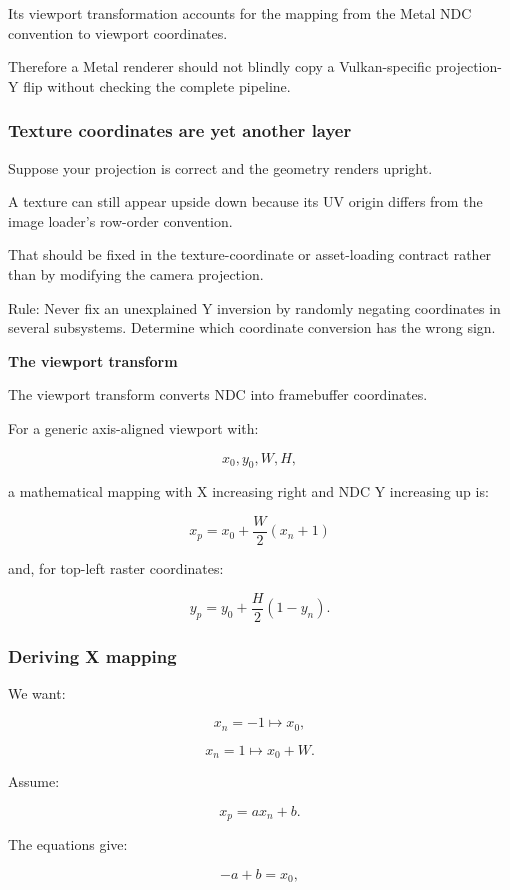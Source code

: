 Its viewport transformation accounts for the mapping from the Metal NDC convention to viewport coordinates.

Therefore a Metal renderer should not blindly copy a Vulkan-specific projection-Y flip without checking the complete pipeline.

\subsubsection{Texture coordinates are yet another layer}\label{texture-coordinates-are-yet-another-layer}

Suppose your projection is correct and the geometry renders upright.

A texture can still appear upside down because its UV origin differs from the image loader's row-order convention.

That should be fixed in the texture-coordinate or asset-loading contract rather than by modifying the camera projection.

Rule: Never fix an unexplained Y inversion by randomly negating coordinates in several subsystems. Determine which coordinate conversion has the wrong sign.

\textbf{The viewport transform}

The viewport transform converts NDC into framebuffer coordinates.

For a generic axis-aligned viewport with:

\[
 x_0,y_0,W,H,
\]

a mathematical mapping with X increasing right and NDC Y increasing up is:

\[
 \boxed{ x_p=x_0+\frac W2(x_n+1) }
\]

and, for top-left raster coordinates:

\[
 \boxed{ y_p=y_0+\frac H2(1-y_n) }.
\]

\subsubsection{Deriving X mapping}\label{deriving-x-mapping}

We want:

\[
 x_n=-1\mapsto x_0,
\]

\[
 x_n=1\mapsto x_0+W.
\]

Assume:

\[
 x_p=ax_n+b.
\]

The equations give:

\[
 -a+b=x_0,
\]


